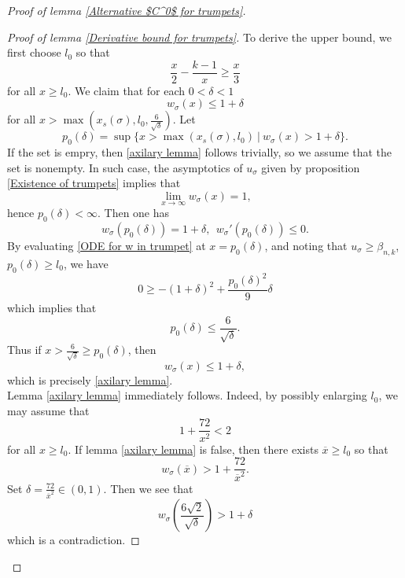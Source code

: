 \documentclass[pdflatex,sn-mathphys-num]{sn-jnl}
\begin{document}
\begin{proof}[Proof of lemma \ref{Alternative $C^0$ for trumpets}]
\begin{proof}[Proof of lemma \ref{Derivative bound for trumpets}]
 To derive the upper bound, we first choose $l_0$ so that
\begin{equation}\label{condition on x1}
    \frac{x}{2} - \frac{k-1}{x }\geq \frac{x}{3}
\end{equation}
for all $x \geq l_0$. We claim that for each $0 <\delta <1$
    \begin{equation}\label{axilary lemma}
        w_{\sigma}(x) \leq 1 + \delta
    \end{equation}
    for all $x > \max(x_{s}(\sigma), l_0,   \frac{6}{\sqrt{\delta}})$. Let 
    \begin{equation}
        p_0(\delta) = \sup\{x > \max(x_{s}(\sigma), l_0) \ | \ w_{\sigma}(x) > 1 + \delta \}.
    \end{equation}
    If the set is empry, then \eqref{axilary lemma} follows trivially, so we assume that the set is nonempty. In such case, the asymptotics of $u_{\sigma}$ given by proposition \ref{Existence of trumpets} implies that
    \begin{equation}
        \lim_{x \to \infty}w_{\sigma}(x) = 1,
    \end{equation}
    hence $p_0(\delta) < \infty$.  Then one has
   $$w_{\sigma}(p_0(\delta)) = 1 + \delta, \ \ w_{\sigma}'(p_{0}(\delta)) \leq 0.$$
   By evaluating \eqref{ODE for w in trumpet} at $x = p_0(\delta)$, and noting that $u_{\sigma} \geq \beta_{n,k}$, $p_0(\delta) \geq l_0$, we have 
   $$0 \geq -(1 + \delta)^2 + \frac{p_0(\delta)^2}{9}\delta$$
   which implies that
   \begin{equation}
       p_0(\delta) \leq \frac{6}{\sqrt{\delta}}.
   \end{equation}
   Thus if $x > \frac{6}{\sqrt{\delta}} \geq p_0(\delta)$, then
   $$w_{\sigma}(x) \leq 1 + \delta,$$
   which is precisely \eqref{axilary lemma}. \\

Lemma \eqref{axilary lemma} immediately follows. Indeed, by possibly enlarging $l_0$, we may assume that
\begin{equation}
    1 + \frac{72}{x^2} < 2
\end{equation}
for all $x \geq l_0$. If lemma \eqref{axilary lemma} is false, then there exists $\overline{x} \geq l_0$ so that
\begin{equation}
    w_{\sigma}(\overline{x}) > 1 + \frac{72}{\overline{x}^2}.
\end{equation}
Set $\delta = \frac{72}{\overline{x}^2} \in (0,1)$. Then we see that 
\begin{equation}
    w_{\sigma}(\frac{6\sqrt{2}}{\sqrt{\delta}}) > 1 + \delta
\end{equation}
which is a contradiction.
\end{proof}


\end{proof}
\end{document}
